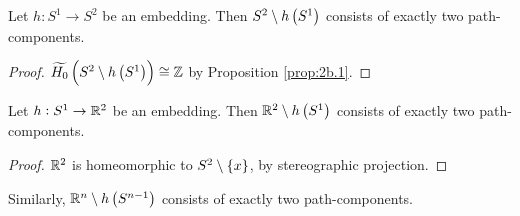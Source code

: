 \begin{corollary}
Let $ h : S^1 \to S^2 $ be an embedding. Then $ S^2 \setminus h\br{S^1} $ consists of exactly two path-components.
\end{corollary}

\begin{proof}
$ \widetilde{H_0}\br{S^2 \setminus h\br{S^1}} \cong \Z $ by Proposition \ref{prop:2b.1}.
\end{proof}

\pagebreak

\begin{corollary}
Let $ h : S^1 \to \mathbb{R}^2 $ be an embedding. Then $ \R^2 \setminus h\br{S^1} $ consists of exactly two path-components.
\end{corollary}

\begin{proof}
$ \mathbb{R}^2 $ is homeomorphic to $ S^2 \setminus \cbr{x} $, by stereographic projection.
\end{proof}

Similarly, $ \R^n \setminus h\br{S^{n - 1}} $ consists of exactly two path-components.


